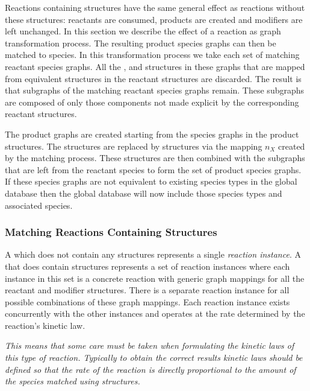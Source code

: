 \documentclass{cekarticle}
\begin{document}
Reactions containing  structures have the same
general effect as reactions without these structures: reactants
are consumed, products are created and modifiers are left
unchanged. In this section we describe the effect of a reaction as
graph transformation process. The resulting product species graphs
can then be matched to species. In this transformation process we
take each set of matching reactant species graphs. All the
,  and
 structures in these graphs that are mapped
from equivalent structures in the reactant
 structures are discarded. The result is
that subgraphs of the matching reactant species graphs remain.
These subgraphs are composed of only those components not made
explicit by the corresponding reactant 
structures.

The product graphs are created starting from the species graphs in
the product  structures.  The
 structures are replaced by
 structures via the mapping $n_{X}$ created by
the matching process. These structures are then combined with the
subgraphs that are left from the reactant species to form the set
of product species graphs. If these species graphs are not
equivalent to existing species types in the global database then
the global database will now include those species types and
associated species.

\subsubsection{Matching Reactions Containing  Structures}

A  which does not contain any 
structures represents a single \emph{reaction instance}.  A
 that does contain  structures
represents a set of reaction instances where each instance in this
set is a concrete reaction with generic graph mappings for all the
reactant and modifier  structures.
There is a separate reaction instance for all possible
combinations of these graph mappings. Each reaction instance
exists concurrently with the other instances and operates at the
rate determined by the reaction's kinetic law.

\emph{This means that some care must be taken when formulating the
kinetic laws of this type of reaction.  Typically to obtain the
correct results kinetic laws should be defined so that the rate of
the reaction is directly proportional to the amount of the species
matched using  structures.}
\end{document}
